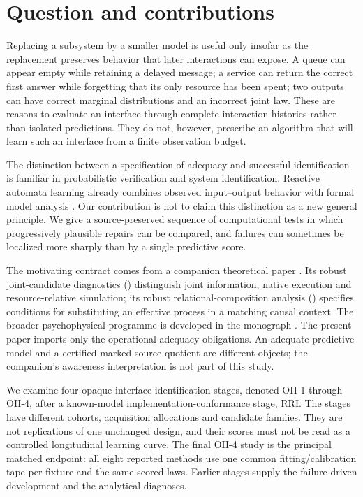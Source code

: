 

\section{Question and contributions}\label{sec:intro}\label{p3:c01}
Replacing a subsystem by a smaller model is useful only insofar as the replacement preserves behavior that later interactions can expose. A queue can appear empty while retaining a delayed message; a service can return the correct first answer while forgetting that its only resource has been spent; two outputs can have correct marginal distributions and an incorrect joint law. These are reasons to evaluate an interface through complete interaction histories rather than isolated predictions. They do not, however, prescribe an algorithm that will learn such an interface from a finite observation budget.

The distinction between a specification of adequacy and successful identification is familiar in probabilistic verification and system identification. Reactive automata learning already combines observed input--output behavior with formal model analysis \cite{Mao2012MDP,MaoJaeger2012}. Our contribution is not to claim this distinction as a new general principle. We give a source-preserved sequence of computational tests in which progressively plausible repairs can be compared, and failures can sometimes be localized more sharply than by a single predictive score.

The motivating contract comes from a companion theoretical paper \cite{RodgersPaper2}. Its robust joint-candidate diagnostics (\RJC) distinguish joint information, native execution and resource-relative simulation; its robust relational-composition analysis (\RRC) specifies conditions for substituting an effective process in a matching causal context. The broader psychophysical programme is developed in the monograph \cite{RodgersSPC2}. The present paper imports only the operational adequacy obligations. An adequate predictive model and a certified marked source quotient are different objects; the companion's awareness interpretation is not part of this study.

We examine four opaque-interface identification stages, denoted OII-1 through OII-4, after a known-model implementation-conformance stage, RRI. The stages have different cohorts, acquisition allocations and candidate families. They are not replications of one unchanged design, and their scores must not be read as a controlled longitudinal learning curve. The final OII-4 study is the principal matched endpoint: all eight reported methods use one common fitting/calibration tape per fixture and the same scored laws. Earlier stages supply the failure-driven development and the analytical diagnoses.

